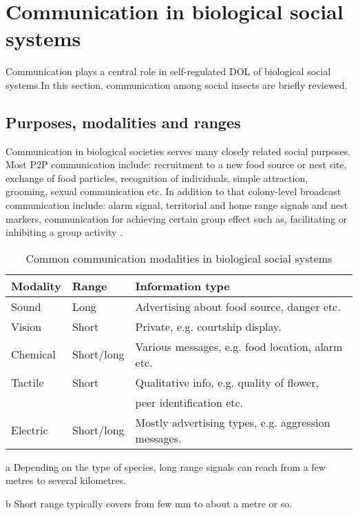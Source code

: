 \section{Communication in biological social systems}
\label{bg:bio-comm}
Communication plays a central role in self-regulated DOL of biological social systems.In this section, communication among  social insects are briefly reviewed.
%
\subsection{Purposes, modalities and ranges}
Communication in biological societies serves many closely related social purposes. Most P2P communication include: recruitment to a new food source or nest site, exchange of food particles, recognition of individuals, simple attraction, grooming, sexual communication etc. In addition to that colony-level broadcast communication include: alarm signal, territorial and home range signals and nest markers, communication for achieving certain group effect such as, facilitating or inhibiting  a group activity \cite{Holldobler1990}.
\begin{table}
\caption{Common communication modalities in biological social systems}
\label{table:bio-comm-modalities}
\begin{center}
\begin{threeparttable}
\begin{tabular}{|l|l|l|}
\hline \textbf{Modality} & \textbf{Range} & \textbf{Information type}\\
\hline Sound & Long\tnote{a} & Advertising about food  source,  danger etc. \\                                                                                                                                               
\hline Vision & Short\tnote{b}  & Private, e.g. courtship display. \\
\hline Chemical  & Short/long & Various messages, e.g. food location, alarm etc.\\
\hline Tactile & Short & Qualitative info, e.g. quality of flower,\\ & & peer identification etc.\\
\hline Electric & Short/long & Mostly advertising types, e.g. aggression messages.\\
\hline
\end{tabular}
\begin{tablenotes}
\item [a]Depending on the type of species, long range signals can reach from a few metres to several kilometres.
\item [b]Short range typically covers from few mm to about a metre or so.
\end{tablenotes}
\end{threeparttable}
\end{center}
\end{table}

